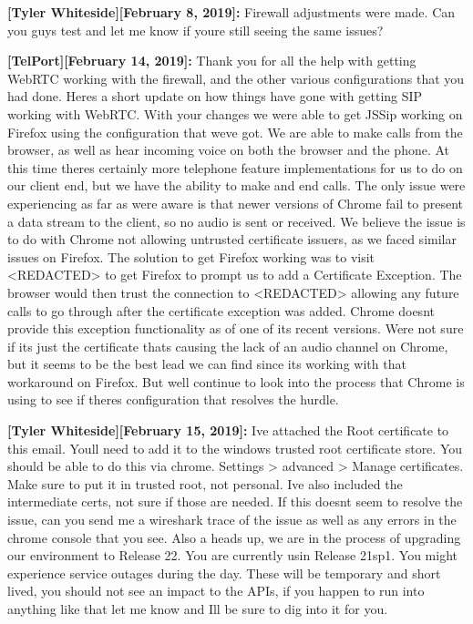 \documentclass[12pt]{article}
\begin{document}
\textbf{[Tyler Whiteside][February 8, 2019]:} Firewall adjustments were made.  Can you guys test and let me know if youre still seeing the same issues?

\textbf{[TelPort][February 14, 2019]:} Thank you for all the help with getting WebRTC working with the firewall, and the other various configurations that you had done. Heres a short update on how things have gone with getting SIP working with WebRTC. With your changes we were able to get JSSip working on Firefox using the configuration that weve got. We are able to make calls from the browser, as well as hear incoming voice on both the browser and the phone. At this time theres certainly more telephone feature implementations for us to do on our client end, but we have the ability to make and end calls. The only issue were experiencing as far as were aware is that newer versions of Chrome fail to present a data stream to the client, so no audio is sent or received.  We believe the issue is to do with Chrome not allowing untrusted certificate issuers, as we faced similar issues on Firefox. The solution to get Firefox working was to visit <REDACTED> to get Firefox to prompt us to add a Certificate Exception. The browser would then trust the connection to <REDACTED> allowing any future calls to go through after the certificate exception was added. Chrome doesnt provide this exception functionality as of one of its recent versions. Were not sure if its just the certificate thats causing the lack of an audio channel on Chrome, but it seems to be the best lead we can find since its working with that workaround on Firefox. But well continue to look into the process that Chrome is using to see if theres configuration that resolves the hurdle.

\textbf{[Tyler Whiteside][February 15, 2019]:} Ive attached the Root certificate to this email.  Youll need to add it to the windows trusted root certificate store.  You should be able to do this via chrome.  Settings > advanced > Manage certificates.  Make sure to put it in trusted root, not personal.   Ive also included the intermediate certs, not sure if those are needed.  If this doesnt seem to resolve the issue, can you send me a wireshark trace of the issue as well as any errors in the chrome console that you see. Also a heads up, we are in the process of upgrading our environment to Release 22.  You are currently usin Release 21sp1.  You might experience service outages during the day.  These will be temporary and short lived, you should not see an impact to the APIs, if you happen to run into anything like that let me know and Ill be sure to dig into it for you.
\end{document}
